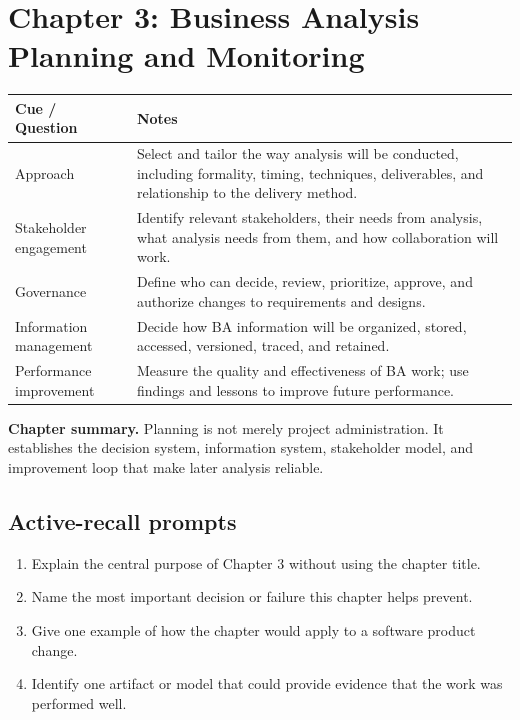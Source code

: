 \documentclass[11pt]{article}
\begin{document}
\section{Chapter 3: Business Analysis Planning and Monitoring}
\begin{longtable}{L{0.26\textwidth} L{0.64\textwidth}}
\toprule
\textbf{Cue / Question} & \textbf{Notes}\\
\midrule
\endhead
Approach & Select and tailor the way analysis will be conducted, including formality, timing, techniques, deliverables, and relationship to the delivery method.\\
Stakeholder engagement & Identify relevant stakeholders, their needs from analysis, what analysis needs from them, and how collaboration will work.\\
Governance & Define who can decide, review, prioritize, approve, and authorize changes to requirements and designs.\\
Information management & Decide how BA information will be organized, stored, accessed, versioned, traced, and retained.\\
Performance improvement & Measure the quality and effectiveness of BA work; use findings and lessons to improve future performance.\\
\bottomrule
\end{longtable}
\begin{keybox}\textbf{Chapter summary.} Planning is not merely project administration. It establishes the decision system, information system, stakeholder model, and improvement loop that make later analysis reliable.\end{keybox}
\subsection*{Active-recall prompts}
\begin{enumerate}
\item Explain the central purpose of Chapter 3 without using the chapter title.
\item Name the most important decision or failure this chapter helps prevent.
\item Give one example of how the chapter would apply to a software product change.
\item Identify one artifact or model that could provide evidence that the work was performed well.
\end{enumerate}
\end{document}
